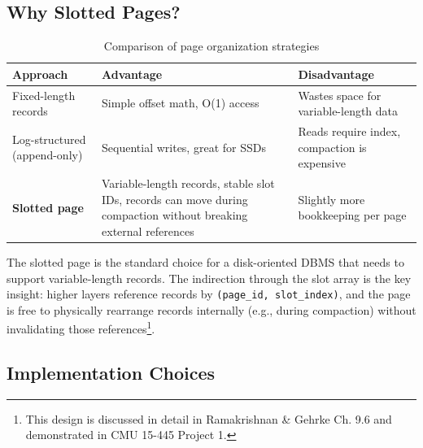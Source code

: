 \documentclass[12pt, a4paper]{report}
\begin{document}
\begin{center}
\end{center}

\subsection{Why Slotted Pages?}

\begin{table}[h]
\centering
\begin{tabularx}{\textwidth}{lXX}
\toprule
\textbf{Approach} & \textbf{Advantage} & \textbf{Disadvantage} \\
\midrule
Fixed-length records &
    Simple offset math, O(1) access &
    Wastes space for variable-length data \\
\addlinespace
Log-structured (append-only) &
    Sequential writes, great for SSDs &
    Reads require index, compaction is expensive \\
\addlinespace
\textbf{Slotted page} &
    Variable-length records, stable slot IDs,
    records can move during compaction without
    breaking external references &
    Slightly more bookkeeping per page \\
\bottomrule
\end{tabularx}
\caption{Comparison of page organization strategies}
\end{table}

The slotted page is the standard choice for a disk-oriented DBMS that needs to
support variable-length records. The indirection through the slot array is the
key insight: higher layers reference records by \texttt{(page\_id, slot\_index)},
and the page is free to physically rearrange records internally (e.g., during
compaction) without invalidating those references\footnote{This design is
discussed in detail in Ramakrishnan \& Gehrke Ch. 9.6 and demonstrated in CMU
15-445 Project 1.}.


\subsection{Implementation Choices}
\end{document}
